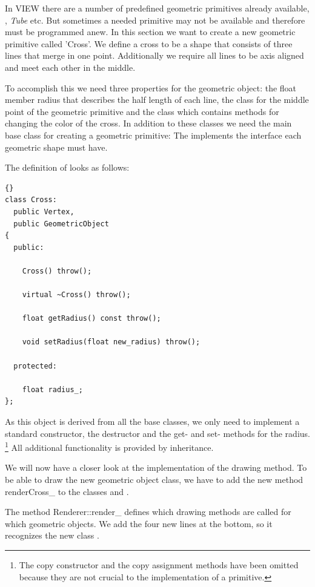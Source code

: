 In VIEW there are a number of
predefined geometric primitives already available, , {\em
Tube} etc. But sometimes a needed primitive may not be available and
therefore must be programmed anew. 
In this section we want to create a new geometric primitive called 'Cross'.
We define a cross to be a shape that consists of three lines that merge in one
point. Additionally we require all lines to be axis aligned and meet each
other in the middle.

To accomplish this we need three properties for the geometric object: the
float member radius that describes the half length of each line, the class 
 for the middle point of the geometric primitive and the class 
 which contains methods for changing the color of the
cross. In addition to these classes we need the main base class for
creating a geometric primitive: The  
implements the interface each geometric shape must have.

The definition of  looks as follows:
\begin{lstlisting}{}
class Cross: 
  public Vertex,
  public GeometricObject
{
  public:

    Cross() throw();

    virtual ~Cross() throw();
		
    float getRadius() const throw();

    void setRadius(float new_radius) throw();

  protected:
					
    float radius_;
};
\end{lstlisting}

As this object is derived from all the base classes, we only need to implement
a standard constructor, the destructor and the get- and set- methods for 
the radius.
\footnote{The copy constructor and the copy assignment methods
have been omitted because they are not crucial to the implementation of a
primitive.} All additional functionality is provided by inheritance.

We will now have a closer look at the implementation of the drawing method. 
To be able to draw the new geometric object class, we have to add the new
method renderCross\_ to the classes  and .

The method Renderer::render\_ defines which drawing methods are called for
which geometric objects. We add the four new lines at the bottom, 
so it recognizes the new class .


